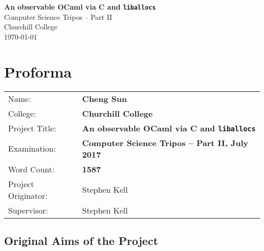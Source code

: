\documentclass[12pt,a4paper,twoside,openright]{report}
\begin{document}





\pagestyle{empty}


\vspace*{60mm}
\begin{center}
\Huge
\textbf{An observable OCaml via C and \lstinline!liballocs!} \\[5mm]
Computer Science Tripos -- Part II \\[5mm]
Churchill College \\[5mm]
\today  %
\end{center}


\pagestyle{plain}

\chapter*{Proforma}

{\large
\begin{tabular}{ll}
Name:               & \bf Cheng Sun                       \\
College:            & \bf Churchill College                     \\
Project Title:      & \bf An observable OCaml via C and \lstinline!liballocs! \\
Examination:        & \bf Computer Science Tripos -- Part II, July 2017  \\
Word Count:         & \bf 1587\footnotemark[1] \\
Project Originator: & Stephen Kell                    \\
Supervisor:         & Stephen Kell                    \\
\end{tabular}
}


\section*{Original Aims of the Project}

\end{document}
